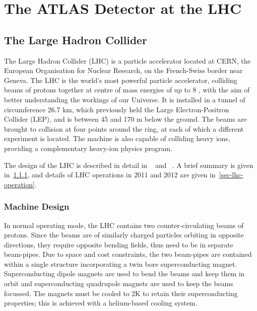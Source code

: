 \graphicspath{{Chapters/Detector/Figures/}}
\chapter{The ATLAS Detector at the LHC}
\label{chap:Detector}

\section{The Large Hadron Collider}

The Large Hadron Collider (LHC) is a particle accelerator located at CERN, the
European Organisation for Nuclear Research, on the French-Swiss border near
Geneva. The LHC is the world's most powerful particle accelerator, colliding
beams of protons together at centre of mass energies of up to 8 \TeV, with the
aim of better understanding the workings of our Universe. It is installed in a
tunnel of circumference 26.7 km, which previously held the Large
Electron-Positron Collider (LEP), and is between 45 and 170 m below the ground.
The beams are brought to collision at four points around the ring, at each of
which a different experiment is located. The machine is also capable of
colliding heavy ions, providing a complementary heavy-ion physics program.

The design of the LHC is described in detail in ~\cite{1748-0221-3-08-S08001}
and ~\cite{Brüning:782076}. A brief summary is given in~\ref{sec-lhc-design},
and details of LHC operations in 2011 and 2012 are given
in~\ref{sec-lhc-operation}.

\subsection{Machine Design}
\label{sec-lhc-design}

In normal operating mode, the LHC contains two counter-circulating beams of protons. 
Since the beams are of similarly charged particles
orbiting in opposite directions, they require opposite bending fields, thus need
to be in separate beam-pipes. Due to space and cost constraints, the two beam-pipes are
contained within a single structure incorporating a twin bore superconducting
magnet. Superconducting dipole magnets are
used to bend the beams and keep them in orbit and superconducting quadrupole magnets are used to
keep the beams focussed. The magnets must be cooled to 2K to retain their superconducting
properties; this is achieved with a helium-based cooling system. 

